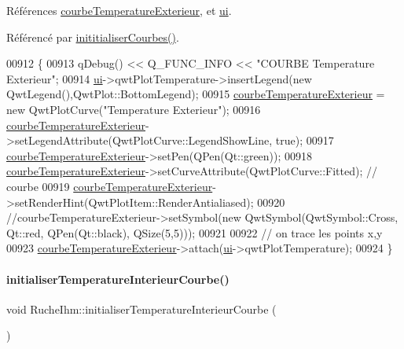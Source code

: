 Références \hyperlink{class_ruche_ihm_a68e72873a859840d3c91b147b8559118}{courbe\+Temperature\+Exterieur}, et \hyperlink{class_ruche_ihm_a64786058bd7f88ca2f1e9743bb27c25b}{ui}.



Référencé par \hyperlink{class_ruche_ihm_a4fe15b22538611ad9ffc4d807f8b78fd}{inititialiser\+Courbes()}.


\begin{DoxyCode}
00912 \{
00913     qDebug() << Q\_FUNC\_INFO << \textcolor{stringliteral}{"COURBE Temperature Exterieur"};
00914     \hyperlink{class_ruche_ihm_a64786058bd7f88ca2f1e9743bb27c25b}{ui}->qwtPlotTemperature->insertLegend(\textcolor{keyword}{new} QwtLegend(),QwtPlot::BottomLegend);
00915     \hyperlink{class_ruche_ihm_a68e72873a859840d3c91b147b8559118}{courbeTemperatureExterieur} = \textcolor{keyword}{new} QwtPlotCurve(\textcolor{stringliteral}{"Temperature Exterieur"});
00916     \hyperlink{class_ruche_ihm_a68e72873a859840d3c91b147b8559118}{courbeTemperatureExterieur}->setLegendAttribute(QwtPlotCurve::LegendShowLine, \textcolor{keyword}{
      true});
00917     \hyperlink{class_ruche_ihm_a68e72873a859840d3c91b147b8559118}{courbeTemperatureExterieur}->setPen(QPen(Qt::green));
00918     \hyperlink{class_ruche_ihm_a68e72873a859840d3c91b147b8559118}{courbeTemperatureExterieur}->setCurveAttribute(QwtPlotCurve::Fitted); \textcolor{comment}{//
       courbe}
00919     \hyperlink{class_ruche_ihm_a68e72873a859840d3c91b147b8559118}{courbeTemperatureExterieur}->setRenderHint(QwtPlotItem::RenderAntialiased);
00920     \textcolor{comment}{//courbeTemperatureExterieur->setSymbol(new QwtSymbol(QwtSymbol::Cross, Qt::red, QPen(Qt::black),
       QSize(5,5)));}
00921 
00922     \textcolor{comment}{// on trace les points x,y}
00923     \hyperlink{class_ruche_ihm_a68e72873a859840d3c91b147b8559118}{courbeTemperatureExterieur}->attach(\hyperlink{class_ruche_ihm_a64786058bd7f88ca2f1e9743bb27c25b}{ui}->qwtPlotTemperature);
00924 \}
\end{DoxyCode}
\mbox{\label{class_ruche_ihm_ad7297b44f6431c0b0c42f1b11d78ace1}} 
\paragraph{\texorpdfstring{initialiser\+Temperature\+Interieur\+Courbe()}{initialiserTemperatureInterieurCourbe()}}
{\footnotesize\ttfamily void Ruche\+Ihm\+::initialiser\+Temperature\+Interieur\+Courbe (\begin{DoxyParamCaption}{ }\end{DoxyParamCaption})\hspace{0.3cm}{\ttfamily [private]}}



